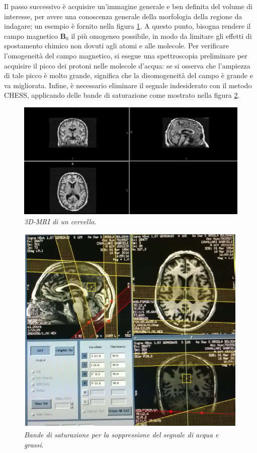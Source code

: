 \documentclass{report}
\newcommand{\figref}[1]{figura \ref{#1}}
\numberwithin{equation}{section}
\numberwithin{figure}{section}
\renewcommand{\Vec}{\bm}
\begin{document}
Il passo successivo è acquisire un'immagine generale e ben definita del volume di interesse, per avere una conoscenza generale della morfologia della regione da indagare; un esempio è fornito nella \figref{fig:gen}. A questo punto, bisogna rendere il campo magnetico $\Vec{B}_0$ il più omogeneo possibile, in modo da limitare gli effetti di spostamento chimico non dovuti agli atomi e alle molecole. Per verificare l'omogeneità del campo magnetico, si esegue una spettroscopia preliminare per acquisire il picco dei protoni nelle molecole d'acqua: se si osserva che l'ampiezza di tale picco è molto grande, significa che la disomogeneità del campo è grande e va migliorata. Infine, è necessario eliminare il segnale indesiderato con il metodo CHESS, applicando delle bande di saturazione come mostrato nella \figref{fig:bande}.

\begin{figure}[htp]
\centering
\includegraphics[scale=0.75]{immagini/gen.png}
\caption{\label{fig:gen} \textit{3D-MRI di un cervello}.}
\end{figure}

\begin{figure}[htp]
\centering
\includegraphics[scale=1.2]{immagini/bande.png}
\caption{\label{fig:bande} \textit{Bande di saturazione per la soppressione del segnale di acqua e grassi}.}
\end{figure}
\end{document}
